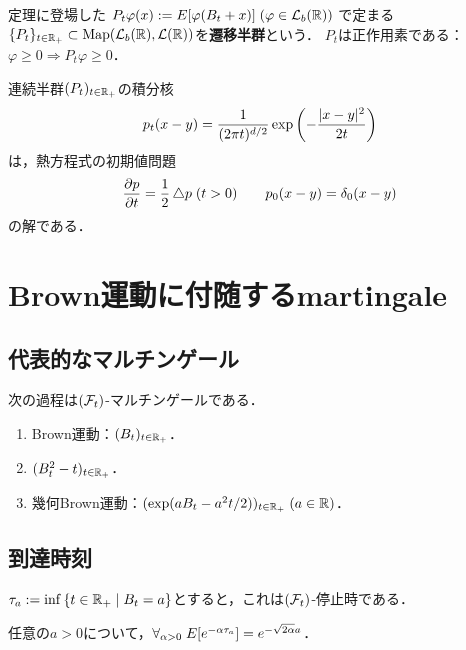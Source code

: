 \documentclass[uplatex,dvipdfmx]{jsreport}
\begin{document}
\begin{definition}
    定理に登場した
    $P_t\varphi(x):=E[\varphi(B_t+x)]\;(\varphi\in \mathcal{L}_b(\mathbb{R}))$
    で定まる$\{P_t\}_{t\in\mathbb{R}_+}\subset\mathrm{Map}(\mathcal{L}_b(\mathbb{R}),\mathcal{L}(\mathbb{R}))$を\textbf{遷移半群}という．
    $P_t$は正作用素である：$\varphi\ge0\Rightarrow P_t\varphi\ge0$．
\end{definition}

\begin{proposition}
    連続半群$(P_t)_{t\in\mathbb{R}_+}$の積分核
    \[p_t(x-y)=\frac{1}{(2\pi t)^{d/2}}\exp\left(-\frac{\lvert x-y\rvert^2}{2t}\right)\]
    は，熱方程式の初期値問題
    \[\frac{\partial p}{\partial t}=\frac{1}{2}\mathop{}\!\mathbin\bigtriangleup p\;(t>0)\qquad p_0(x-y)=\delta_0(x-y)\]
    の解である．
\end{proposition}

\section{Brown運動に付随するmartingale}

\subsection{代表的なマルチンゲール}

\begin{theorem}
    次の過程は$(\mathcal{F}_t)$-マルチンゲールである．
    \begin{enumerate}
        \item Brown運動：$(B_t)_{t\in\mathbb{R}_+}$．
        \item $(B^2_t-t)_{t\in\mathbb{R}_+}$．
        \item 幾何Brown運動：$(\exp(aB_t-a^2t/2))_{t\in\mathbb{R}_+}\;(a\in\mathbb{R})$．
    \end{enumerate}
\end{theorem}

\subsection{到達時刻}

\begin{lemma}
    $\tau_a:=\inf\left\{t\in\mathbb{R}_+\mid B_t=a\right\}$とすると，これは$(\mathcal{F}_t)$-停止時である．
\end{lemma}

\begin{proposition}
    任意の$a>0$について，$\forall_{\alpha>0}\;E[e^{-\alpha\tau_a}]=e^{-\sqrt{2\alpha}a}$．
\end{proposition}
\end{document}
